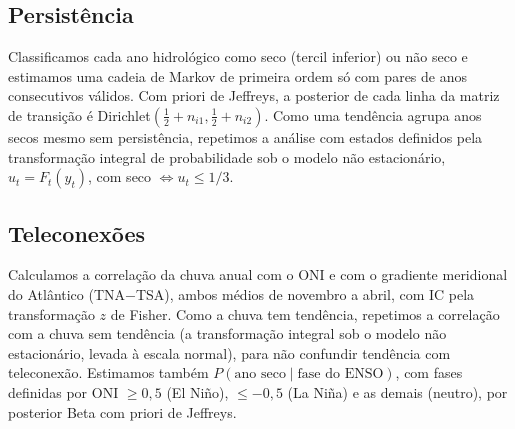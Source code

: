 \documentclass[11pt,a4paper]{article}
\begin{document}
\subsection{Persistência}
Classificamos cada ano hidrológico como seco (tercil inferior) ou não seco e estimamos uma
cadeia de Markov de primeira ordem só com pares de anos consecutivos válidos. Com priori
de Jeffreys, a posterior de cada linha da matriz de transição é Dirichlet$(\tfrac12 + n_{i1},
\tfrac12 + n_{i2})$. Como uma tendência agrupa anos secos mesmo sem persistência, repetimos
a análise com estados definidos pela transformação integral de probabilidade sob o modelo não
estacionário, $u_t = F_t(y_t)$, com seco $\Leftrightarrow u_t \le 1/3$.

\subsection{Teleconexões}
Calculamos a correlação da chuva anual com o ONI e com o gradiente meridional do Atlântico
(TNA$-$TSA), ambos médios de novembro a abril, com IC pela transformação $z$ de Fisher. Como a
chuva tem tendência, repetimos a correlação com a chuva sem tendência (a transformação integral
sob o modelo não estacionário, levada à escala normal), para não confundir tendência com
teleconexão. Estimamos também $P(\text{ano seco} \mid \text{fase do ENSO})$, com fases definidas
por ONI $\ge 0{,}5$ (El Niño), $\le -0{,}5$ (La Niña) e as demais (neutro), por posterior Beta
com priori de Jeffreys.
\end{document}
